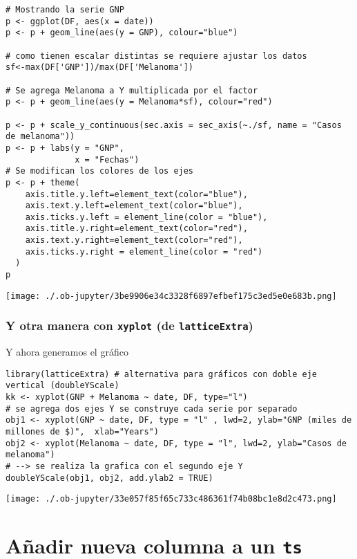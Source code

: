 \documentclass[11pt]{article}
\begin{document}
\begin{verbatim}
# Mostrando la serie GNP
p <- ggplot(DF, aes(x = date))
p <- p + geom_line(aes(y = GNP), colour="blue")

# como tienen escalar distintas se requiere ajustar los datos
sf<-max(DF['GNP'])/max(DF['Melanoma'])

# Se agrega Melanoma a Y multiplicada por el factor
p <- p + geom_line(aes(y = Melanoma*sf), colour="red")

p <- p + scale_y_continuous(sec.axis = sec_axis(~./sf, name = "Casos de melanoma"))
p <- p + labs(y = "GNP",
              x = "Fechas")
# Se modifican los colores de los ejes
p <- p + theme(
    axis.title.y.left=element_text(color="blue"),
    axis.text.y.left=element_text(color="blue"),
    axis.ticks.y.left = element_line(color = "blue"),
    axis.title.y.right=element_text(color="red"),
    axis.text.y.right=element_text(color="red"),
    axis.ticks.y.right = element_line(color = "red")
  )
p
\end{verbatim}

\label{}
\begin{center}
\texttt{[image: ./.ob-jupyter/3be9906e34c3328f6897efbef175c3ed5e0e683b.png]}
\end{center}
\subsubsection{Y otra manera con \texttt{xyplot} (de \texttt{latticeExtra})}
\label{sec:org868a8a5}

Y ahora generamos el gráfico
\begin{verbatim}
library(latticeExtra) # alternativa para gráficos con doble eje vertical (doubleYScale)
kk <- xyplot(GNP + Melanoma ~ date, DF, type="l")
# se agrega dos ejes Y se construye cada serie por separado
obj1 <- xyplot(GNP ~ date, DF, type = "l" , lwd=2, ylab="GNP (miles de millones de $)",  xlab="Years")
obj2 <- xyplot(Melanoma ~ date, DF, type = "l", lwd=2, ylab="Casos de melanoma")
# --> se realiza la grafica con el segundo eje Y
doubleYScale(obj1, obj2, add.ylab2 = TRUE)
\end{verbatim}

\label{}
\begin{center}
\texttt{[image: ./.ob-jupyter/33e057f85f65c733c486361f74b08bc1e8d2c473.png]}
\end{center}
\section{Añadir nueva columna a un \texttt{ts}}
\label{sec:org232f3cd}
\end{document}
